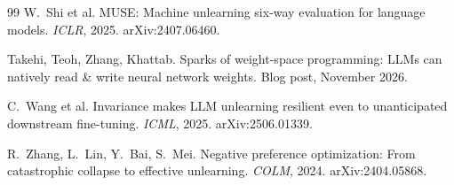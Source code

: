 \documentclass[10pt,twocolumn,letterpaper]{article}
\begin{document}
\begin{thebibliography}{99}
W.~Shi et al.
MUSE: Machine unlearning six-way evaluation for language models. \emph{ICLR}, 2025. arXiv:2407.06460.

Takehi, Teoh, Zhang, Khattab.
Sparks of weight-space programming: LLMs can natively read \& write neural network weights. Blog post, November 2026.

C.~Wang et al.
Invariance makes LLM unlearning resilient even to unanticipated downstream fine-tuning. \emph{ICML}, 2025.
arXiv:2506.01339.

R.~Zhang, L.~Lin, Y.~Bai, S.~Mei.
Negative preference optimization: From catastrophic collapse to effective unlearning. \emph{COLM}, 2024.
arXiv:2404.05868.

\end{thebibliography}
\end{document}
